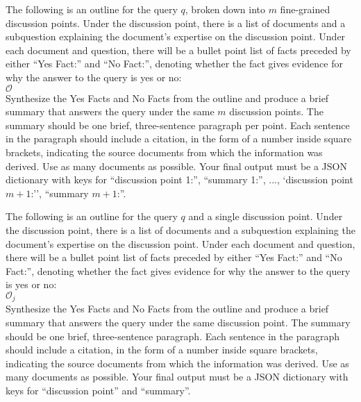 \begin{prompt}[title={Prompt \thetcbcounter: Full Outline Summarization Prompt (\cref{subsection:summary})}, label=prompt:full]
The following is an outline for the query $q$, broken down into $m$ fine-grained discussion points. Under the discussion point, there is a list of documents and a subquestion explaining the document's expertise on the discussion point. Under each document and question, there will be a bullet point list of facts preceded by either ``Yes Fact:'' and ``No Fact:'', denoting whether the fact gives evidence for why the answer to the query is yes or no:\\
$\mathcal{O}$ \\
Synthesize the Yes Facts and No Facts from the outline and produce a brief summary that answers the query under the same $m$ discussion points. The summary should be one brief, three-sentence paragraph per point. Each sentence in the paragraph should include a citation, in the form of a number inside square brackets, indicating the source documents from which the information was derived. Use as many documents as possible. Your final output must be a JSON dictionary with keys for ``discussion point 1:'', ``summary 1:'', ..., `discussion point $m+1$:'', ``summary $m+1$:''.
\end{prompt}

\begin{prompt}[title={Prompt \thetcbcounter: Topic-Level Outline Summarization Prompt (\cref{subsection:summary})}, label=prompt:topic]
The following is an outline for the query $q$ and a single discussion point. Under the discussion point, there is a list of documents and a subquestion explaining the document's expertise on the discussion point. Under each document and question, there will be a bullet point list of facts preceded by either ``Yes Fact:'' and ``No Fact:'', denoting whether the fact gives evidence for why the answer to the query is yes or no:\\
$\mathcal{O}_j$ \\
Synthesize the Yes Facts and No Facts from the outline and produce a brief summary that answers the query under the same discussion point. The summary should be one brief, three-sentence paragraph. Each sentence in the paragraph should include a citation, in the form of a number inside square brackets, indicating the source documents from which the information was derived. Use as many documents as possible. Your final output must be a JSON dictionary with keys for ``discussion point'' and ``summary''.
\end{prompt}

